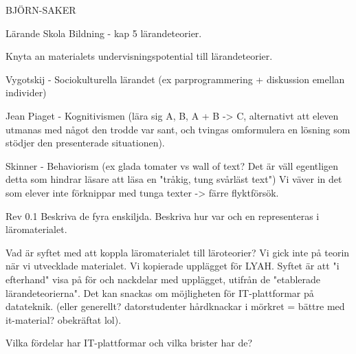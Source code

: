 \begin{binge}
BJÖRN-SAKER

    Lärande Skola Bildning - kap 5 lärandeteorier\cite{LSB}.

Knyta an materialets undervisningspotential till lärandeteorier.

Vygotskij - Sociokulturella lärandet (ex parprogrammering + diskussion emellan individer)

Jean Piaget - Kognitivismen (lära sig A, B, A + B -> C, alternativt att eleven utmanas med något den trodde var sant, och tvingas omformulera en lösning som stödjer den presenterade situationen).

Skinner - Behaviorism (ex glada tomater vs wall of text? Det är väll egentligen detta som hindrar läsare att läsa en "tråkig, tung svårläst text")
Vi väver in det som elever inte förknippar med tunga texter -> färre flyktförsök.

Rev 0.1
Beskriva de fyra enskiljda.
Beskriva hur var och en representeras i läromaterialet.

Vad är syftet med att koppla läromaterialet till läroteorier?
    Vi gick inte på teorin när vi utvecklade materialet. Vi kopierade upplägget för LYAH. 
    Syftet är att "i efterhand" visa på för och nackdelar med upplägget, utifrån de "etablerade lärandeteorierna".
    Det kan snackas om möjligheten för IT-plattformar på datateknik. (eller generellt? datorstudenter hårdknackar i mörkret = bättre med it-material? obekräftat lol).

    Vilka fördelar har IT-plattformar och vilka brister har de?


\end{binge}
